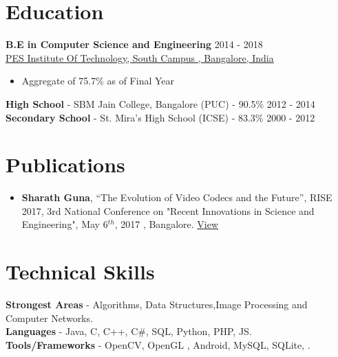 \documentclass[margin, centered]{res}
\begin{document}
\begin{resume}

\section{Education}
\textbf{B.E in Computer Science and Engineering } \hfill 2014 - 2018 \\
\href{http://pesitsouth.pes.edu/}{  PES Institute Of Technology, South Campus , Bangalore, India}
\begin{itemize}
 \item Aggregate of 75.7\% as of Final Year
\end{itemize}
\textbf{High School} - {SBM Jain College, Bangalore} (PUC) - 90.5\% \hfill 2012 - 2014 \\
\textbf{Secondary School} - St. Mira's High School (ICSE) - 83.3\% \hfill 2000 - 2012


\section{Publications}
\begin{itemize}[leftmargin=*]
\item  \textbf{Sharath Guna}, ``The Evolution of Video Codecs and the Future'', RISE 2017, 3rd National Conference on "Recent Innovations in Science and Engineering", May 6$^{th}$, 2017 , Bangalore. \href{https://www.ijsr.net/conf/RISE2017/IJSR10.pdf}{View}
\end{itemize}


\section{Technical \hspace{2mm} Skills}
\textbf{Strongest Areas} - Algorithms, Data Structures,Image Processing and Computer Networks. \\
\textbf{Languages} - Java, C, C++, C\#, SQL, Python, PHP, JS.\\
\textbf{Tools/Frameworks} - OpenCV, OpenGL , Android, MySQL, SQLite, .



\end{resume}
\end{document}
